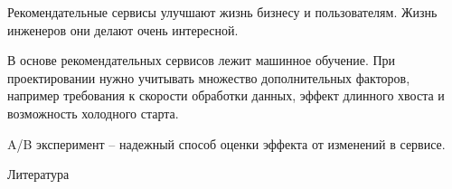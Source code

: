 \documentclass[11pt,aspectratio=169]{beamer}
\begin{document}
\begin{frame}
\begin{tcolorbox}[colback=info!5,colframe=info!80]
Рекомендательные сервисы улучшают жизнь бизнесу и пользователям. Жизнь инженеров они делают очень интересной.
\end{tcolorbox}
\vfill
\begin{tcolorbox}[colback=info!5,colframe=info!80]
В основе рекомендательных сервисов лежит машинное обучение. При проектировании  нужно учитывать множество дополнительных факторов, например требования к скорости обработки данных, эффект длинного хвоста и возможность холодного старта.
\end{tcolorbox}
\vfill
\begin{tcolorbox}[colback=info!5,colframe=info!80]
A/B эксперимент -- надежный способ оценки эффекта от изменений в сервисе.
\end{tcolorbox}

\end{frame}

\begin{frame}[allowframebreaks]{Литература}




\end{frame}
\end{document}
